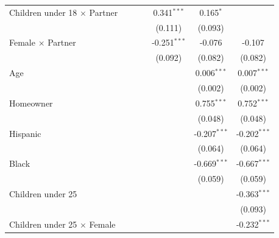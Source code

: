 \begin{tabular}{lcccccc}
   Children under 18 $\times$ Partner  &                &                &                & 0.341$^{***}$  & 0.165$^{*}$    &   \\   
                                       &                &                &                & (0.111)        & (0.093)        &   \\   
   Female $\times$ Partner             &                &                &                & -0.251$^{***}$ & -0.076         & -0.107\\   
                                       &                &                &                & (0.092)        & (0.082)        & (0.082)\\   
   Age                                 &                &                &                &                & 0.006$^{***}$  & 0.007$^{***}$\\   
                                       &                &                &                &                & (0.002)        & (0.002)\\   
   Homeowner                           &                &                &                &                & 0.755$^{***}$  & 0.752$^{***}$\\   
                                       &                &                &                &                & (0.048)        & (0.048)\\   
   Hispanic                            &                &                &                &                & -0.207$^{***}$ & -0.202$^{***}$\\   
                                       &                &                &                &                & (0.064)        & (0.064)\\   
   Black                               &                &                &                &                & -0.669$^{***}$ & -0.667$^{***}$\\   
                                       &                &                &                &                & (0.059)        & (0.059)\\   
   Children under 25                   &                &                &                &                &                & -0.363$^{***}$\\   
                                       &                &                &                &                &                & (0.093)\\   
   Children under 25 $\times$ Female   &                &                &                &                &                & -0.232$^{***}$\\   

\end{tabular}
